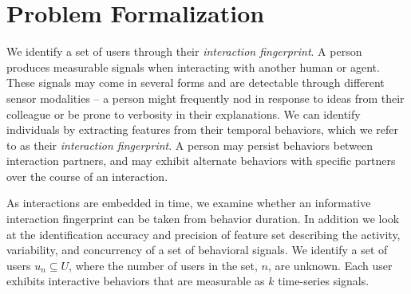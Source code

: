 \documentclass[conference]{IEEEtran}
\begin{document}

\section{Problem Formalization}

We identify a set of users through their \textit{interaction fingerprint}. A person produces measurable signals when interacting with another human or agent. These signals may come in several forms and are detectable through different sensor modalities -- a person might frequently nod in response to ideas from their colleague or be prone to verbosity in their explanations. We can identify individuals by extracting features from their temporal behaviors, which we refer to as their \textit{interaction fingerprint}. A person may persist behaviors between interaction partners, and may exhibit alternate behaviors with specific partners over the course of an interaction. 

As interactions are embedded in time, we examine whether an informative interaction fingerprint can be taken from behavior duration. In addition we look at the identification accuracy and precision of feature set describing the activity, variability, and concurrency of a set of behavioral signals. We identify a set of users $u_n \subseteq U$, where the number of users in the set, $n$, are unknown. Each user exhibits interactive behaviors that are measurable as $k$ time-series signals.
\end{document}

